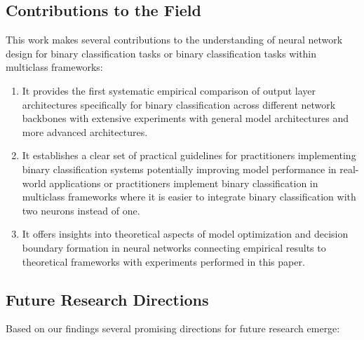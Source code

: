 \subsection{Contributions to the Field}

This work makes several contributions to the understanding of neural network design for binary classification tasks or binary classification tasks within multiclass frameworks:

\begin{enumerate}
\item It provides the first systematic empirical comparison of output layer architectures specifically for binary classification across different network backbones with extensive experiments with general model architectures and more advanced architectures.

\item It establishes a clear set of practical guidelines for practitioners implementing binary classification systems potentially improving model performance in real-world applications or practitioners implement binary classification in multiclass frameworks where it is easier to integrate binary classification with two neurons instead of one.

\item It offers insights into theoretical aspects of model optimization and decision boundary formation in neural networks connecting empirical results to theoretical frameworks with experiments performed in this paper.
\end{enumerate}

\subsection{Future Research Directions}

Based on our findings several promising directions for future research emerge:

